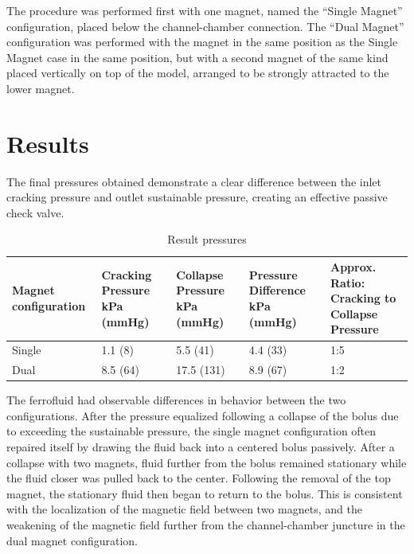 \documentclass[]{asme2ej}
\begin{document}
The procedure was performed first with one magnet, named the “Single
Magnet” configuration, placed below the channel-chamber connection.
The “Dual Magnet” configuration was performed with the magnet in the
same position as the Single Magnet case in the same position, but with
a second magnet of the same kind placed vertically on top of the model,
arranged to be strongly attracted to the lower magnet.

\section{Results}
The final pressures obtained demonstrate a clear difference between
the inlet cracking pressure and outlet sustainable pressure, creating
an effective passive check valve.

\begin{table}[t]
\footnotesize
\caption{Result pressures}
\begin{center}
\label{table_ASME}
\begin{tabular}{|p{0.3in} |p{0.4in} |p{0.49in} |p{0.45in} |p{0.6in} |}
\hline
Magnet configuration &
Cracking Pressure kPa  (mmHg) &
Collapse Pressure kPa  (mmHg) &
Pressure Difference kPa  (mmHg) &
Approx. Ratio: Cracking to Collapse Pressure \\
\hline
Single &
1.1 (8) &
5.5 (41) &
4.4 (33) &
1:5 \\
\hline
Dual &
8.5 (64) &
17.5 (131)&
8.9 (67)&
1:2 \\
\hline
\end{tabular}
\end{center}
\end{table}


The ferrofluid had observable differences in behavior between the two
configurations.  After the pressure equalized
following a collapse of the bolus due to
exceeding the sustainable pressure, the single magnet
configuration often repaired itself by drawing the fluid back
into a centered bolus passively.
After a collapse with two magnets, fluid further from the bolus
remained stationary while the fluid closer was pulled back to the
center. Following the removal of the top magnet, the stationary fluid
then began to return to the bolus. This is consistent with the
localization of the magnetic field between two magnets, and the
weakening of the magnetic field further from the channel-chamber
juncture in the dual magnet configuration.
\end{document}
